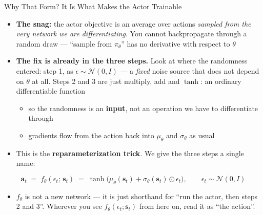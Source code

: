 \begin{frame}{Why That Form? It Is What Makes the Actor Trainable}
\small
\begin{itemize}
    \item \textbf{The snag:} the actor objective is an average over actions \emph{sampled from the very network we are differentiating}. You cannot backpropagate through a random draw --- ``sample from $\pi_\theta$'' has no derivative with respect to $\theta$
    \vspace{0.4em}
    \item \textbf{The fix is already in the three steps.} Look at where the randomness entered: step 1, as $\epsilon \sim \mathcal{N}(0,I)$ --- a \emph{fixed} noise source that does not depend on $\theta$ at all. Steps 2 and 3 are just multiply, add and $\tanh$: an ordinary differentiable function
    \begin{itemize}
        \item so the randomness is an \textbf{input}, not an operation we have to differentiate through
        \item gradients flow from the action back into $\mu_\theta$ and $\sigma_\theta$ as usual
    \end{itemize}
    \vspace{0.4em}
    \item This is the \textbf{reparameterization trick}. We give the three steps a single name:
\end{itemize}
\vspace{-0.2em}
\[
\mathbf{a}_t \;=\; f_\theta(\epsilon_t;\, \mathbf{s}_t) \;=\; \tanh\!\big(\mu_\theta(\mathbf{s}_t) + \sigma_\theta(\mathbf{s}_t)\odot\epsilon_t\big),
\qquad \epsilon_t \sim \mathcal{N}(0,I)
\]
\vspace{-0.2em}
\begin{itemize}
    \item[] {\footnotesize $f_\theta$ is not a new network --- it is just shorthand for ``run the actor, then steps 2 and 3''. Wherever you see $f_\theta(\epsilon_t;\mathbf{s}_t)$ from here on, read it as ``the action''.}
\end{itemize}
\end{frame}

